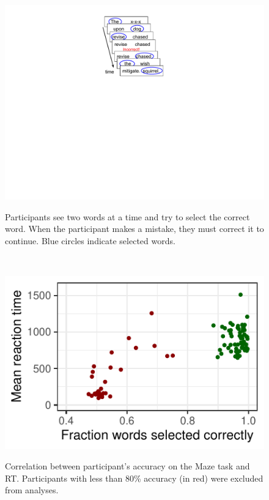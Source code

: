 \documentclass[11pt,a4paper]{article}
\begin{document}
\newpage
\begin{figure}
	\begin{minipage}{.5\textwidth}
		{\center\includegraphics[clip, trim=9cm 12.5cm 10cm 1cm,width=.8\textwidth]{maze_diagram.pdf}\\} 
		\begin{small}
			Participants see two words at a time and try to select the correct word.  When the participant makes a mistake, they must correct it to continue. Blue circles indicate selected words.
			
		\end{small}
		
	\end{minipage}
	~~~
	\begin{minipage}{.5\textwidth}	
		{\center\includegraphics[width=\textwidth]{error.pdf}\\} 
		\begin{small}
			Correlation between participant's accuracy on the Maze task and RT. Participants with less than 80\% accuracy (in red) were excluded from analyses. 
			
		\end{small}
	\end{minipage}
\end{figure}
\end{document}
